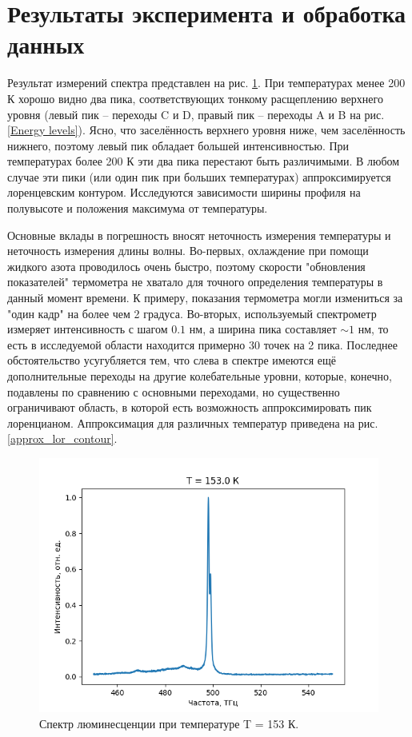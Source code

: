 \section{Результаты эксперимента и обработка данных}
Результат измерений спектра представлен на рис. \ref{spectre_general}. 
При температурах менее 200 К хорошо видно два пика, соответствующих тонкому 
расщеплению верхнего уровня (левый пик -- переходы C и D, правый пик -- переходы
A и B на рис. \ref{Energy levels}). Ясно, что заселённость верхнего уровня
ниже, чем заселённость нижнего, поэтому левый пик обладает большей интенсивностью.
При температурах более 200 К эти два пика перестают быть различимыми. В любом случае
эти пики (или один пик при больших температурах) аппроксимируется лоренцевским
контуром. Исследуются зависимости ширины профиля на полувысоте и положения максимума
от температуры.  

Основные вклады в погрешность вносят неточность измерения температуры и неточность
измерения длины волны. Во-первых, охлаждение при помощи жидкого азота проводилось
очень быстро, поэтому скорости "обновления показателей" термометра не хватало
для точного определения температуры в данный момент времени. К примеру, показания
термометра могли измениться за "один кадр" на более чем 2 градуса. Во-вторых,
используемый спектрометр измеряет интенсивность с шагом $0.1 \text{ нм}$, а ширина
пика составляет $\sim 1 \text{ нм}$, то есть в исследуемой области находится примерно
30 точек на 2 пика. Последнее обстоятельство усугубляется тем, что слева в спектре 
имеются ещё дополнительные переходы на другие колебательные уровни, которые, конечно,
подавлены по сравнению с основными переходами, но существенно ограничивают область,
в которой есть возможность аппроксимировать пик лоренцианом. Аппроксимация для различных
температур приведена на рис. \ref{approx_lor_contour}. 

\begin{figure}[!h]
    \begin{center}
        \includegraphics[width=0.7 \linewidth]{spectre_general.png}
        \caption{Спектр люминесценции при температуре T = 153 К.}
        \label{spectre_general}
    \end{center}
\end{figure}


